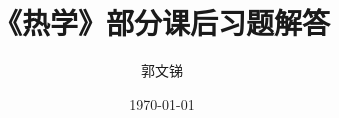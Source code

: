 \documentclass{ctexart}
\begin{document}
\title{《热学》部分课后习题解答}

\author{郭文锑}

\date{\today}

\maketitle

\tableofcontents





\end{document}
